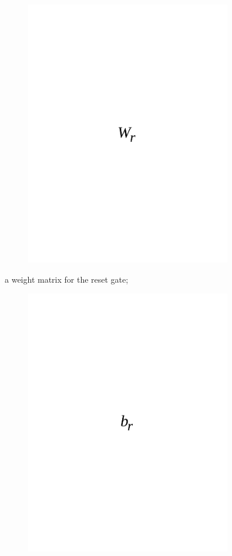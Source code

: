 \begin{figure}[H]
	\centering
	\includegraphics[width=0.8\textwidth]{media/ict/image69}
	\caption*{}
\end{figure}

a weight matrix for the reset gate;
\begin{figure}[H]
	\centering
	\includegraphics[width=0.8\textwidth]{media/ict/image70}
	\caption*{}
\end{figure}

